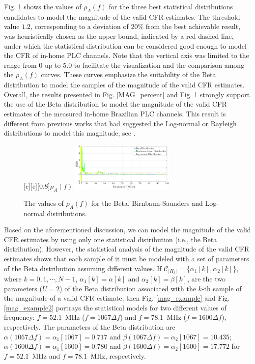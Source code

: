 \documentclass[journal]{IEEEtran}
\begin{document}
Fig. \ref{fig:Log_like} shows the values of $\rho_{A}(f)$ for the three best statistical distributions candidates to model the magnitude of the valid \ac{CFR} estimates. The threshold value $1.2$, corresponding to a deviation of $20\%$ from the best achievable result, was heuristically chosen as the upper bound, indicated by a red dashed line, under which the statistical distribution can be considered good enough to model the \ac{CFR} of in-home \ac{PLC} channels. Note that the vertical axis was limited to the range from $0$ up to $5.0$ to facilitate the visualization and the comparison among the $\rho_{A} (f)$ curves. These curves emphasize the suitability of the Beta distribution to model the samples of the magnitude of the valid \ac{CFR} estimates. Overall, the results presented in Fig. \ref{MAG_percent} and Fig. \ref{fig:Log_like} strongly support the use of the Beta distribution to model the magnitude of the valid \ac{CFR} estimates of the measured in-home Brazilian \ac{PLC} channels. This result is different from previous works that had suggested the Log-normal or Rayleigh distributions to model this magnitude, see \cite{Galli:Wireline,RayleighPLC}.

\begin{figure}[h!]
	\centering
	[c][0.8]{$\rho_{A} (f)$}
	\includegraphics[width=0.45\textwidth]{images/LLH_BETA_BIRN_LogN_1.7.eps}
	\caption{The values of $\rho_{A} (f)$ for the Beta, Birnbaun-Saunders and Log-normal distributions.}
	\label{fig:Log_like}
\end{figure}

Based on the aforementioned discussion, we can model the magnitude of the valid \ac{CFR} estimates by using only one statistical distribution (i.e., the Beta distribution). However, the statistical analysis of the magnitude of the valid \ac{CFR} estimates shows that each sample of it must be modeled with a set of parameters of the Beta distribution assuming different values. If $\mathcal{C}_{|H_k|} = \{\alpha_{1}[k],\alpha_{2}[k]\}$, where $k=0,1,\cdots,N-1$,  $\alpha_{1}[k] = \alpha[k]$ and $\alpha_{2}[k] = \beta[k]$, are the two parameters ($U=2$) of the Beta distribution associated with the $k$-th sample of the magnitude of a valid \ac{CFR} estimate, then Fig. \ref{mag_example} and Fig. \ref{mag_example2} portrays the statistical models for two different values of frequency: $f=52.1$~MHz ($f = 1067\Delta f$) and $f=78.1$~MHz ($f = 1600\Delta f$), respectively. The parameters of the Beta distribution are  $\alpha(1067 \Delta f) = \alpha_{1}[1067]=0.717$ and $\beta( 1067 \Delta f) = \alpha_{2}[1067] = 10.435$; $\alpha(1600 \Delta f) = \alpha_{1}[1600] = 0.780$ and $\beta( 1600 \Delta f) = \alpha_{2}[1600]=17.772$ for $f=52.1$~MHz and $f=78.1$~MHz, respectively.
\end{document}
